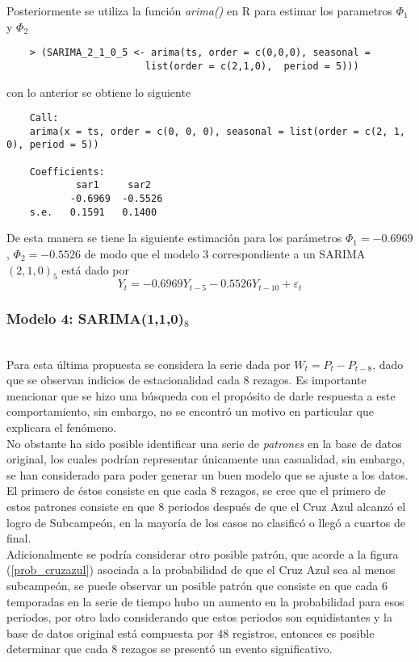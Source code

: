 \documentclass{article}
\theoremstyle{remark}
\begin{document}
Posteriormente se utiliza la función \textit{arima()} en R para estimar los parametros $\Phi_1$ y $\Phi_2$

\begin{verbatim}
    > (SARIMA_2_1_0_5 <- arima(ts, order = c(0,0,0), seasonal = 
                        list(order = c(2,1,0),  period = 5))) 
\end{verbatim}
con lo anterior se obtiene lo siguiente
\begin{verbatim}
    Call:
    arima(x = ts, order = c(0, 0, 0), seasonal = list(order = c(2, 1, 0), period = 5))

    Coefficients:
            sar1     sar2
           -0.6969  -0.5526
    s.e.   0.1591   0.1400
\end{verbatim}
De esta manera se tiene la siguiente estimación para los parámetros $\Phi_1=-0.6969$, $\Phi_2 = -0.5526$ de modo que el modelo 3 correspondiente a un SARIMA $(2,1,0)_5$ está dado por
\begin{equation*}
    Y_t = -0.6969Y_{t-5} -0.5526 Y_{t-10} + \varepsilon_t 
\end{equation*}

\subsubsection{Modelo 4: SARIMA(1,1,0)$_8$}\\
Para esta última propuesta se considera la serie dada por $W_t = P_t - P_{t-8}$, dado que se observan indicios de estacionalidad cada 8 rezagos. Es importante mencionar que se hizo una búsqueda con el propósito de darle respuesta a este comportamiento, sin embargo, no se encontró un motivo en particular que explicara el fenómeno.\\ 

No obstante ha sido posible identificar una serie de \textit{patrones} en la base de datos original, los cuales podrían representar únicamente una casualidad, sin embargo, se han considerado para poder generar un buen modelo que se ajuste a los datos. El primero de éstos consiste en que cada 8 rezagos, se cree que el primero de estos patrones consiste en que 8 periodos después de que el Cruz Azul alcanzó el logro de Subcampeón, en la mayoría de los casos no clasificó o llegó a cuartos de final. \\

Adicionalmente se podría considerar otro posible patrón, que acorde a la figura (\ref{prob_cruzazul}) asociada a la probabilidad de que el Cruz Azul sea al menos subcampeón, se puede observar un posible patrón que consiste en que cada 6 temporadas en la serie de tiempo hubo un aumento en la probabilidad para esos periodos, por otro lado considerando que estos periodos son equidistantes y la base de datos original está compuesta por 48 registros, entonces es posible determinar que cada 8 rezagos se presentó un evento significativo. \\
\end{document}
